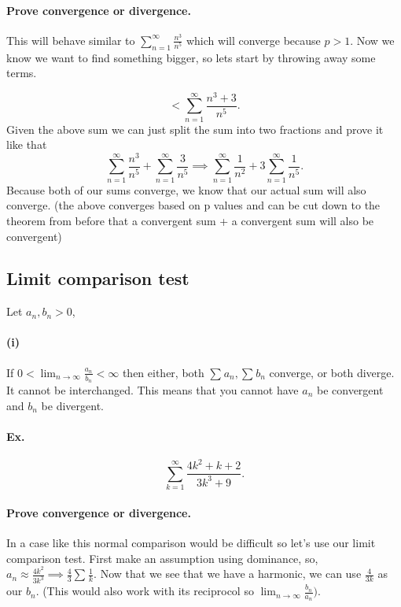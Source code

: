 \paragraph{Prove convergence or divergence. \\}
This will behave similar to $ \sum_{ n=1 } ^{ \infty } \frac{ n^3 }{ n^{ 5 } } $ which will converge because $ p>1 $. Now we know we want to find something bigger, so lets start by throwing away some terms. 

\[
<\sum_{ n=1 } ^{ \infty } \frac{ n^3+3 }{ n^{ 5 } }
.\] 
Given the above sum we can just split the sum into two fractions and prove it like that
\[
\sum_{ n=1 } ^{ \infty } \frac{ n^3 }{ n^{ 5 } } +\sum_{ n=1 } ^{ \infty } \frac{ 3 }{ n^{ 5 } } \implies \sum_{ n=1 } ^{ \infty } \frac{ 1 }{ n^2 } +3\sum_{ n=1 } ^{ \infty } \frac{ 1 }{ n^{ 5 } } 
.\] 
Because both of our sums converge, we know that our actual sum will also converge. (the above converges based on p values and can be cut down to the theorem from before that a convergent sum + a convergent sum will also be convergent) 
\subsection*{Limit comparison test}%
\label{sub:Limit comparison test}
Let $ a_n, b_n > 0 $,
\paragraph{(i)}
If $ 0<\lim_{ n \to \infty} \frac{ a_n }{ b_n }<\infty  $ then either, both $ \sum_{  } ^{  } a_n, \sum_{  } ^{  } b_n $ converge, or both diverge. It cannot be interchanged. This means that you cannot have $ a_n $ be convergent and $ b_n $ be divergent. 

\paragraph{Ex.}
\[
\sum_{ k=1 } ^{ \infty } \frac{ 4k^2+k+2 }{ 3k^3+9 }
.\] 
\paragraph{Prove convergence or divergence.\\}
In a case like this normal comparison would be difficult so let's use our limit comparison test. First make an assumption using dominance, so, $ a_n \approx \frac{ 4k^2 }{ 3k^3 } \implies \frac{ 4 }{ 3 } \sum_{  } ^{  } \frac{ 1 }{ k } $. Now that we see that we have a harmonic, we can use $ \frac{ 4 }{ 3k }  $ as our $ b_n $. (This would also work with its reciprocol so $ \lim_{ n \to \infty} \frac{ b_n }{ a_n } )$. 

